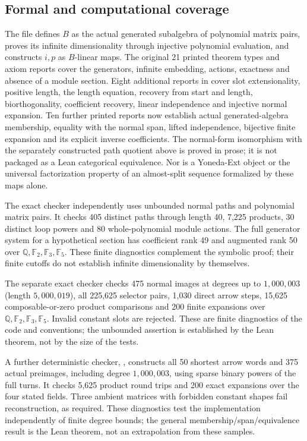 \documentclass[11pt,oneside,openany]{book}
\theoremstyle{definition}\newtheorem{definition}[theorem]{Definition}
\theoremstyle{remark}\newtheorem{remark}[theorem]{Remark}
\begin{document}
\subsection{Formal and computational coverage}
The file  defines $B$ as the
actual generated subalgebra of polynomial matrix pairs, proves its
infinite dimensionality through injective polynomial evaluation, and
constructs $i,p$ as $B$-linear maps. The original 21 printed theorem types and
axiom reports cover the generators, infinite embedding, actions,
exactness and absence of a module section. Eight additional reports in
 cover slot extensionality, positive length, the length
equation, recovery from start and length, biorthogonality, coefficient
recovery, linear independence and injective normal expansion. Ten further printed reports now establish actual generated-algebra
membership, equality with the normal span, lifted independence, bijective
finite expansion and its explicit inverse coefficients. The normal-form isomorphism
with the separately constructed path quotient above is proved in prose; it is not packaged as
a Lean categorical equivalence. Nor is a Yoneda-Ext object or the
universal factorization property of an almost-split sequence formalized
by these maps alone.

The exact checker  independently
uses unbounded normal paths and polynomial matrix pairs. It checks
405 distinct paths through length 40, 7,225 products, 30 distinct loop
powers and 80 whole-polynomial module actions. The full generator system
for a hypothetical section has coefficient rank 49 and augmented rank 50
over $\mathbb Q,\mathbb F_2,\mathbb F_3,\mathbb F_5$.
These finite diagnostics complement the symbolic proof; their finite
cutoffs do not establish infinite dimensionality by themselves.


The separate exact checker 
checks 475 normal images at degrees up to $1{,}000{,}003$ (length
$5{,}000{,}019$), all 225,625 selector pairs, 1,030 direct arrow steps,
15,625 composable-or-zero product comparisons and 200 finite expansions
over $\mathbb Q,\mathbb F_2,\mathbb F_3,\mathbb F_5$. Invalid constant
slots are rejected. These are finite diagnostics of the code and
conventions; the unbounded assertion is established by the Lean theorem,
not by the size of the tests.


A further deterministic checker,
, constructs all 50 shortest
arrow words and 375 actual preimages, including degree $1{,}000{,}003$,
using sparse binary powers of the full turns. It checks 5,625 product
round trips and 200 exact expansions over the four stated fields.
Three ambient matrices with forbidden constant shapes fail reconstruction,
as required. These diagnostics test the implementation independently of
finite degree bounds; the general membership/span/equivalence result is
the Lean theorem, not an extrapolation from these samples.
\end{document}
